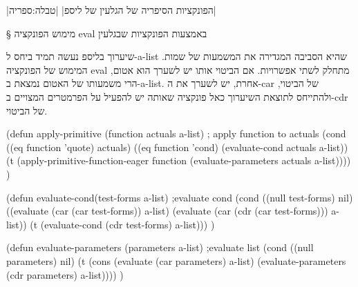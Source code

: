 \documentclass[a4paper,12pt,reqno]{article}
\begin{document}
\begin{table}[H]
\begin{tabularx}
    \bottomrule
  \end{tabularx}
  |הפונקציות הסיפריה של הגלעין של ליספ|
  |טבלה:ספריה|
\end{table}

§ מימוש הפונקציה eval באמצעות הפונקציות שבגלעין

שיערוך בליספ נעשה תמיד ביחס ל-a-list שהיא הסביבה המגדירה את המשמעות של שמות.
המימוש של הפונקציה eval מתחלק לשתי אפשרויות. אם הביטוי אותו יש לשערך הוא אטום,
הרי משמעותו של האטום נמצאת ב-a-list.
אחרת, יש לשערך את ה-car של הביטוי, ולהתייחס לתוצאת השיערוך כאל פונקציה שאותה יש
להפעיל על הפרמטרים המצויים ב-cdr של הביטוי.
\begin{LISP}
(defun
  apply-primitive (function actuals a-list) ; apply function to actuals
    (cond
      ((eq function 'quote) actuals)
      ((eq function 'cond) (evaluate-cond actuals a-list))
      (t
        (apply-primitive-function-eager
          function
          (evaluate-parameters actuals a-list))))
)
\end{LISP}

\begin{LISP}
(defun evaluate-cond(test-forms a-list) ;evaluate cond
    (cond
    ((null test-forms) nil)
    ((evaluate (car (car test-forms)) a-list)
    (evaluate (car (cdr (car test-forms))) a-list))
    (t (evaluate-cond (cdr test-forms) a-list)))
)
\end{LISP}

\begin{LISP}
(defun evaluate-parameters (parameters a-list) ;evaluate list
  (cond
    ((null parameters) nil)
    (t
      (cons
         (evaluate (car parameters) a-list)
         (evaluate-parameters (cdr parameters) a-list))))
)
\end{LISP}
\end{document}
